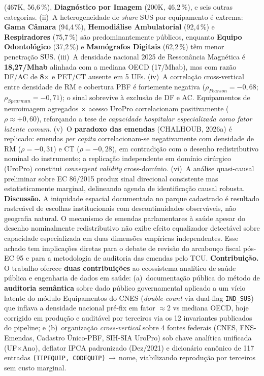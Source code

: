 \documentclass[12pt,a4paper,oneside]{article}
\begin{document}
\begin{singlespace}
(467K, 56,6\,\%), \textbf{Diagnóstico por Imagem} (200K, 46,2\,\%),
e seis outras categorias.
(ii)~A heterogeneidade de \textit{share} SUS por equipamento é
extrema: \textbf{Gama Câmara} (94,4\,\%), \textbf{Hemodiálise
Ambulatorial} (92,4\,\%) e \textbf{Respiradores} (75,7\,\%) são
predominantemente públicos, enquanto \textbf{Equipo Odontológico}
(37,2\,\%) e \textbf{Mamógrafos Digitais} (62,2\,\%) têm menor
penetração SUS.
(iii)~A densidade nacional 2025 de Ressonância Magnética é
\textbf{18,27/Mhab} \textemdash{} alinhada com a mediana OECD
(17/Mhab), mas com razão DF/AC de \textbf{8$\times$} e PET/CT
ausente em 5 UFs.
(iv)~A correlação cross-vertical entre densidade de RM e cobertura
PBF é fortemente negativa ($\rho_{Pearson} = -0{,}68$;
$\rho_{Spearman} = -0{,}71$); o sinal sobrevive à exclusão de DF e
AC. Equipamentos de neuroimagem agregados $\times$ acesso UroPro
correlacionam positivamente ($\rho \approx +0{,}60$), reforçando a
tese de \textit{capacidade hospitalar especializada como fator
latente comum}.
(v)~O \textbf{paradoxo das emendas} (CHALHOUB, 2026a) é replicado:
emendas \textit{per capita} correlacionam-se negativamente com
densidade de RM ($\rho = -0{,}31$) e CT ($\rho = -0{,}28$), em
contradição com o desenho redistributivo nominal do instrumento;
a replicação independente em domínio cirúrgico (UroPro)
constitui \textit{convergent validity} cross-domínio.
(vi)~A análise quasi-causal preliminar sobre EC 86/2015 produz
sinal direcional consistente mas estatisticamente marginal,
delineando agenda de identificação causal robusta.
\textbf{Discussão.} A iniquidade espacial documentada no parque
cadastrado é resultado rastreável de escolhas institucionais com
descontinuidades observáveis, não geografia natural. O mecanismo de
emendas parlamentares à saúde \textemdash{} apesar do desenho
nominalmente redistributivo \textemdash{} não exibe efeito
equalizador detectável sobre capacidade especializada em duas
dimensões empíricas independentes. Esse achado tem implicações
diretas para o debate de revisão do arcabouço fiscal pós-EC 95 e
para a metodologia de auditoria das emendas pelo TCU.
\textbf{Contribuição.} O trabalho oferece \textbf{duas
contribuições} ao ecossistema analítico de saúde pública e
engenharia de dados em saúde: (a)~documentação pública do método
de \textbf{auditoria semântica} sobre dado público governamental
\textemdash{} aplicado a um vício latente do módulo Equipamentos do
CNES (\textit{double-count} via dual-flag \texttt{IND\_SUS}) que
inflava a densidade nacional pré-fix em fator $\approx$2 vs
mediana OECD, hoje corrigido em produção e auditável por terceiros
via os 12 invariantes publicados do pipeline; e (b)~organização
\textit{cross-vertical} sobre 4 fontes federais (CNES, FNS-Emendas,
Cadastro Único-PBF, SIH-SIA UroPro) sob chave analítica unificada
(UF$\times$Ano), deflator IPCA padronizado (Dez/2021) e dicionário
canônico de 117 entradas \texttt{(TIPEQUIP, CODEQUIP)}\,$\to$\,nome,
viabilizando reprodução por terceiros sem custo marginal.


\end{singlespace}
\end{document}
